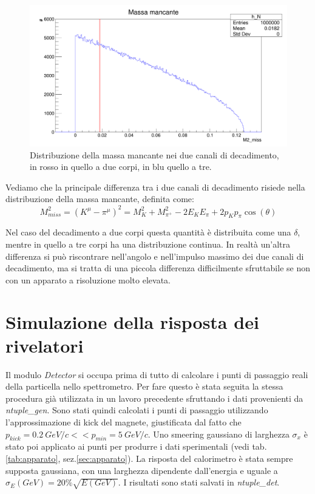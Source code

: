 \documentclass[8pt]{extarticle}
\begin{document}
\begin{figure}
\begin{center}
\includegraphics[scale=0.25]{gen_miss}
\caption{Distribuzione della massa mancante nei due canali di decadimento, in rosso in quello a due corpi, in blu quello a tre.}
\label{fig:gen_miss}
\end{center}
\end{figure}

Vediamo che la principale differenza tra i due canali di decadimento risiede nella distribuzione della massa mancante, definita come: \\
$$
M^2_{miss} = (K^{\mu} - \pi^{\mu})^2 = M^2_K +  M^2_{\pi^+} - 2E_K E_\pi + 2 p_K p_\pi \cos(\theta)
$$

Nel caso del decadimento a due corpi questa quantità è distribuita come una $\delta$, mentre in quello a tre corpi ha una distribuzione continua. 
In realtà un'altra differenza si può riscontrare nell'angolo e nell'impulso massimo dei due canali di decadimento, ma si tratta di una piccola differenza difficilmente sfruttabile se non con un apparato a risoluzione molto elevata. 

\section{Simulazione della risposta dei rivelatori} \label{sec:detector}
Il modulo \textit{Detector} si occupa prima di tutto di calcolare i punti di passaggio reali della particella nello spettrometro. Per fare questo è stata seguita la stessa procedura già utilizzata in un lavoro precedente\cite{spettrometro} sfruttando i dati provenienti da \textit{ntuple\_gen}. Sono stati quindi calcolati i punti di passaggio utilizzando l'approssimazione di kick del magnete, giustificata dal fatto che $p_{kick} = 0.2\ GeV/c << p_{min} = 5\ GeV/c$. Uno smeering gaussiano di larghezza $\sigma_x$ è stato poi applicato ai punti per produrre i dati sperimentali (vedi tab.\ref{tab:apparato}, sez.\ref{sec:apparato}). La risposta del calorimetro è stata sempre supposta gaussiana, con una larghezza dipendente dall'energia e uguale a $\sigma_E (GeV) = 20\% \sqrt{E(GeV)}$. I risultati sono stati salvati in \textit{ntuple\_det}.
\end{document}
